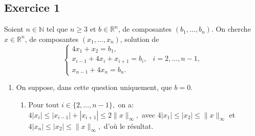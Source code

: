 \documentclass{article}
\date{}%
\renewcommand{\geq}{\geqslant}
\renewcommand{\leq}{\leqslant}
\newcommand{\1}{\ensuremath{\mathbbm{1}}}
\begin{document}
\subsection*{Exercice 1}

Soient $n \in \mathbb{N}$ tel que $n \geq 3$ et $b \in \mathbb{R}^n$, de composantes $(b_1, \ldots, b_n)$. On cherche $x \in \mathbb{R}^n$, de composantes $(x_1, \ldots, x_n)$, solution de
\[
\begin{cases}
4x_1 + x_2 = b_1, \\
x_{i-1} + 4x_i + x_{i+1} = b_i, & i = 2, \ldots, n - 1, \\
x_{n-1} + 4x_n = b_n.
\end{cases}
\]
\begin{enumerate}
    \item On suppose, dans cette question uniquement, que $b = 0$.
    \begin{enumerate}
        \item Pour tout $i \in \{2, \ldots, n-1\},$ on a:\\
$4 |x_i|\leq |x_{i-1}|+|x_{i+1}|\leq 2 \|x\|_\infty,$
avec $4 |x_1|\leq |x_2|\leq \|x\|_\infty$ et $4 |x_{n}|\leq |x_2|\leq \|x\|_\infty,$
d'o\`u le r\'esultat. 




\end{enumerate}
\end{enumerate}
\end{document}
